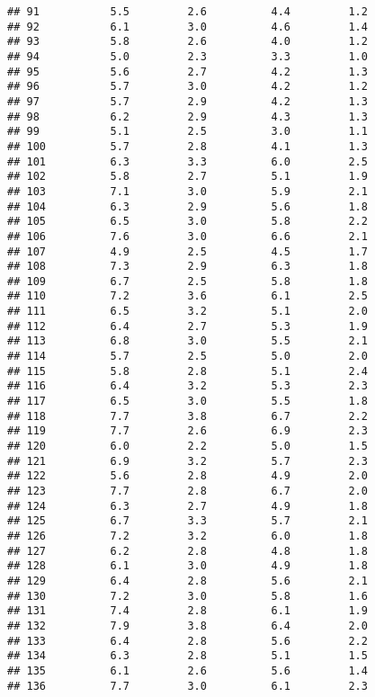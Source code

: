 \documentclass[]{article}
\begin{document}
\begin{verbatim}
## 91           5.5         2.6          4.4         1.2
## 92           6.1         3.0          4.6         1.4
## 93           5.8         2.6          4.0         1.2
## 94           5.0         2.3          3.3         1.0
## 95           5.6         2.7          4.2         1.3
## 96           5.7         3.0          4.2         1.2
## 97           5.7         2.9          4.2         1.3
## 98           6.2         2.9          4.3         1.3
## 99           5.1         2.5          3.0         1.1
## 100          5.7         2.8          4.1         1.3
## 101          6.3         3.3          6.0         2.5
## 102          5.8         2.7          5.1         1.9
## 103          7.1         3.0          5.9         2.1
## 104          6.3         2.9          5.6         1.8
## 105          6.5         3.0          5.8         2.2
## 106          7.6         3.0          6.6         2.1
## 107          4.9         2.5          4.5         1.7
## 108          7.3         2.9          6.3         1.8
## 109          6.7         2.5          5.8         1.8
## 110          7.2         3.6          6.1         2.5
## 111          6.5         3.2          5.1         2.0
## 112          6.4         2.7          5.3         1.9
## 113          6.8         3.0          5.5         2.1
## 114          5.7         2.5          5.0         2.0
## 115          5.8         2.8          5.1         2.4
## 116          6.4         3.2          5.3         2.3
## 117          6.5         3.0          5.5         1.8
## 118          7.7         3.8          6.7         2.2
## 119          7.7         2.6          6.9         2.3
## 120          6.0         2.2          5.0         1.5
## 121          6.9         3.2          5.7         2.3
## 122          5.6         2.8          4.9         2.0
## 123          7.7         2.8          6.7         2.0
## 124          6.3         2.7          4.9         1.8
## 125          6.7         3.3          5.7         2.1
## 126          7.2         3.2          6.0         1.8
## 127          6.2         2.8          4.8         1.8
## 128          6.1         3.0          4.9         1.8
## 129          6.4         2.8          5.6         2.1
## 130          7.2         3.0          5.8         1.6
## 131          7.4         2.8          6.1         1.9
## 132          7.9         3.8          6.4         2.0
## 133          6.4         2.8          5.6         2.2
## 134          6.3         2.8          5.1         1.5
## 135          6.1         2.6          5.6         1.4
## 136          7.7         3.0          6.1         2.3

\end{verbatim}
\end{document}
